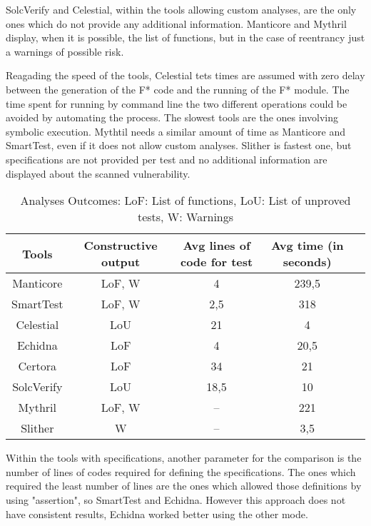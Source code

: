 SolcVerify and Celestial, within the tools allowing custom analyses, are the only ones which do not provide any additional information. 
Manticore and Mythril display, when it is possible, the list of functions, but in the case of reentrancy just a warnings of possible risk. 

Reagading the speed of the tools, Celestial tets times are assumed with zero delay between the generation of the F* code and the running of the F* module. 
The time spent for running by command line the two different operations could be avoided by automating the process.
The slowest tools are the ones involving symbolic execution. Mythtil needs a similar amount of time as Manticore and SmartTest, even if it does not allow custom analyses. 
Slither is fastest one, but specifications are not provided per test and no additional information are displayed about the scanned vulnerability.
\begin{center}
    \begin{table*}
        \footnotesize
        \caption{Analyses Outcomes: 
        LoF: List of functions, LoU: List of unproved tests, W: Warnings}
        \label{tab:Outcomes}
        \begin{tabular}{ccccc}
        \toprule
        Tools  & Constructive output &  Avg lines of code for test & Avg time (in seconds) \\
        \midrule
            Manticore & LoF, W  & 4  &  239,5 \\
            SmartTest & LoF, W & 2,5 &  318  \\
            Celestial & LoU & 21  &  4  \\
            Echidna & LoF  & 4  & 20,5 \\
            Certora & LoF   & 34 &  21  \\ 
            SolcVerify & LoU  &  18,5 &  10  \\
            Mythril & LoF, W  & --  &  221  \\ 
            Slither& W & --  &  3,5  \\ 
        \bottomrule
        \end{tabular}
    \end{table*}
\end{center}

Within the tools with specifications, another parameter for the comparison is the number of lines of codes required for defining the specifications. 
The ones which required the least number of lines are the ones which allowed those definitions by using "assertion", so SmartTest and Echidna. 
However this approach does not have consistent results, Echidna worked better using the other mode. 

